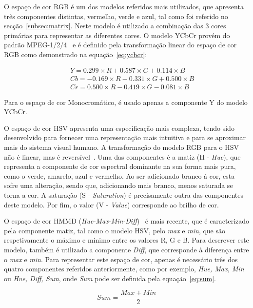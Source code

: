 O espaço de cor RGB é um dos modelos referidos mais utilizados, que apresenta três componentes distintas, vermelho, verde e azul, tal como foi referido no secção~\ref{subsec:matrix}. Neste modelo é utilizado a combinação das 3 cores primárias para representar as diferentes cores. O modelo YCbCr provém do padrão MPEG-1/2/4~\cite{Ite-vil} e é definido pela transformação linear do espaço de cor RGB como demonstrado na equação~\ref{eq:ycbcr}:

\begin{eqnarray}
&& Y = 0.299\times R + 0.587\times G + 0.114\times B\nonumber\\
&& Cb = -0.169\times R - 0.331\times G + 0.500\times B \nonumber\\
&& Cr = 0.500\times R - 0.419\times G - 0.081\times B \label{eq:ycbcr}
\end{eqnarray} 

Para o espaço de cor Monocromático, é usado apenas a componente Y do modelo YCbCr. 

O espaço de cor HSV apresenta uma especificação mais complexa, tendo sido desenvolvido para fornecer uma representação mais intuitiva e para se aproximar mais do sistema visual humano. A transformação do modelo RGB para o HSV não é linear, mas é reversível~\cite{Manjunath2001}. Uma das componentes é a matiz (H - \textit{Hue}), que representa a componente de cor espectral dominante na sua forma mais pura, como o verde, amarelo, azul e vermelho. Ao ser adicionado branco à cor, esta sofre uma alteração, sendo que, adicionando mais branco, menos saturada se torna a cor. A saturação (S - \textit{Saturation}) é precisamente outra das componentes deste modelo. Por fim, o valor (V - \textit{Value}) corresponde ao brilho de cor.

O espaço de cor HMMD (\textit{Hue-Max-Min-Diff})~\cite{Manjunath2001, Ite-vil} é mais recente, que é caracterizado pela componente matiz, tal como o modelo HSV, pelo \textit{max} e \textit{min}, que são respetivamente o máximo e mínimo entre os valores R, G e B. Para descrever este modelo, também é utilizado a componente \textit{Diff}, que corresponde à diferença entre o \textit{max} e \textit{min}. Para representar este espaço de cor, apenas é necessário três dos quatro componentes referidos anteriormente, como por exemplo, {\textit{Hue, Max, Min}} ou {\textit{Hue, Diff, Sum}}, onde \textit{Sum} pode ser definida pela equação~\ref{eq:sum}.

\begin{equation}
Sum = \frac{Max + Min}{2}
\label{eq:sum}
\end{equation}

